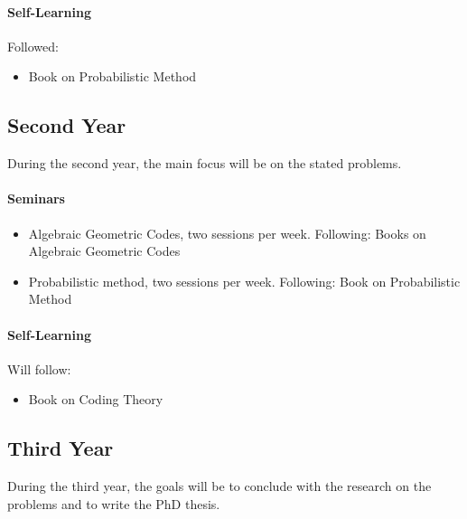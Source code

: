 \paragraph*{Self-Learning} Followed:
\begin{itemize}
\item Book on Probabilistic Method \cite{prob_method}
\end{itemize}

\subsection*{Second Year}
During the second year, the main focus will be on the stated problems.

\paragraph*{Seminars}
\begin{itemize}
\item Algebraic Geometric Codes, two sessions per week. Following: Books on Algebraic Geometric Codes \cite{stichtenoth, vladut}
\item Probabilistic method, two sessions per week. Following: Book on Probabilistic Method \cite{prob_method}
\end{itemize}

\paragraph*{Self-Learning} Will follow:
\begin{itemize}
\item Book on Coding Theory \cite{mcwilliams}
\end{itemize}

\subsection*{Third Year}
During the third year, the goals will be to conclude with the research on the problems and to write the PhD thesis.
